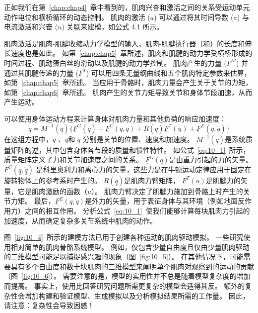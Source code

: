 正如我们在第~\ref{chap:chap4}~章中看到的，肌肉兴奋和激活之间的关系受运动单元动作电位和横桥循环的动态控制。
肌肉的激活 ($a$) 可以通过将其时间导数 ($\dot{a}$) 与电流激活和兴奋 ($u$) 关联来建模，如公式 4.1 所示。


肌肉激活是肌肉-肌腱收缩动力学模型的输入，肌肉-肌腱执行器（和）的长度和伸长速度也是如此。
如第~\ref{chap:chap5}~章所述，肌肉和肌腱的动力学受横桥形成的时间过程、肌动蛋白丝的滑动以及肌腱的动力学控制。
肌肉产生的力量 ($F^M$) 并通过其肌腱传递的力量 ($F^T$) 可以用四条无量纲曲线和五个肌肉特定参数来估算，如第~\ref{chap:chap5}~章所述。
当应用于骨骼时，肌肉力量会产生关于关节的力矩，如第~\ref{chap:chap6}~章所述。
肌肉产生的关节力矩导致关节和身体节段加速，从而产生运动。


可以使用身体运动方程来计算身体对肌肉力量和其他负荷的响应加速度：
\begin{equation}
	\underline{\ddot{q}} = M^{-1} (\underline{q})
			\{
				\underline{F}^G (\underline{q}) + 
				\underline{F}^C (q, \dot{q}) + 
				R(\underline{q}) \underline{F}^T (\underline{u}) + 
				\underline{F}^E (\underline{q}, \underline{\dot{q}})
			\}  \label{eq:10_1}
\end{equation}
%
在这组方程中，$\underline{q}$ 、$\underline{\dot{q}}$和 $\underline{\ddot{q}}$ 分别是关节的位置、速度和加速度。
$M^{-1} (\underline{q})$是系统质量矩阵的逆，其中包含身体各节段的质量和惯性特性。
如公式~\ref{eq:10_1}~所示，质量矩阵定义了力和关节加速度之间的关系。 
$\underline{F}^G (q)$是由重力引起的力的矢量。
$\underline{F}^C (\underline{q}, \underline{\dot{q}})$ 是科里奥利力和离心力的矢量，这些力是在牛顿运动定律应用于固定在旋转物体上的参考系时产生的。
$R(\underline{q})$是肌肉力臂矩阵， $\underline{F}^T (u)$是肌腱力的矢量，它是肌肉激励的函数（$\underline{u}$）。
肌肉力臂决定了肌腱力施加到骨骼上时产生的关节力矩。
最后，$\underline{F}^E (q, \dot{q})$是外力的矢量，用于表征身体与其环境（例如地面反作用力）之间的相互作用。
分析公式~\ref{eq:10_1}~使我们能够计算每块肌肉力引起的加速度，从而确定复杂多关节系统中肌肉的动作。


图~\ref{fig:10_4}~所示的建模方法已用于创建各种运动的肌肉驱动模拟。
一些研究使用相对简单的肌肉骨骼系统模型。
例如，仅包含少量自由度且仅由少量肌肉驱动的二维模型可能足以捕捉感兴趣的现象（图~\ref{fig:10_5}）。
在其他情况下，可能需要具有多个自由度和数十块肌肉的三维模型来阐明单个肌肉对观察到的运动的贡献（图~\ref{fig:10_6}）。
需要注意的是，模型的实用性并不总是随着模型复杂度的增加而提高。
事实上，使用比回答研究问题所需更复杂的模型会适得其反。
额外的复杂性会增加构建和验证模型、生成模拟以及分析模拟结果所需的工作量。
因此，请注意：复杂性会导致困惑！


